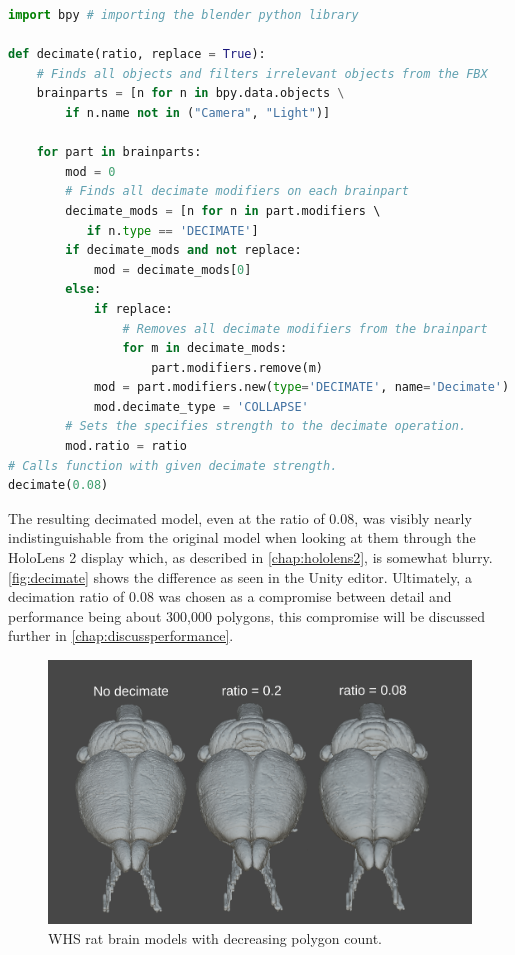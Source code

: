 \begin{lstlisting}[language=python, label={item:blenderscript}, caption={Blender script applying a decimate modifier to all relevant objects in a scene.}]
import bpy # importing the blender python library

def decimate(ratio, replace = True):
    # Finds all objects and filters irrelevant objects from the FBX 
    brainparts = [n for n in bpy.data.objects \
        if n.name not in ("Camera", "Light")] 

    for part in brainparts:
        mod = 0
        # Finds all decimate modifiers on each brainpart
        decimate_mods = [n for n in part.modifiers \ 
           if n.type == 'DECIMATE']
        if decimate_mods and not replace:
            mod = decimate_mods[0]
        else:
            if replace: 
                # Removes all decimate modifiers from the brainpart
                for m in decimate_mods:
                    part.modifiers.remove(m)
            mod = part.modifiers.new(type='DECIMATE', name='Decimate')
            mod.decimate_type = 'COLLAPSE'
        # Sets the specifies strength to the decimate operation. 
        mod.ratio = ratio
# Calls function with given decimate strength.
decimate(0.08)
\end{lstlisting}

The resulting decimated model, even at the ratio of 0.08, was visibly nearly indistinguishable from the original model when looking at them through the HoloLens 2 display which, as described in \autoref{chap:hololens2}, is somewhat blurry. \autoref{fig:decimate} shows the difference as seen in the Unity editor. Ultimately, a decimation ratio of 0.08 was chosen as a compromise between detail and performance being about 300,000 polygons, this compromise will be discussed further in \autoref{chap:discussperformance}.
\begin{figure}[ht]
    \includegraphics[width=\textwidth]{fig/brainmodeldecimateratio2.png}
    \caption{WHS rat brain models with decreasing polygon count.}
    \label{fig:decimate}
\end{figure}

